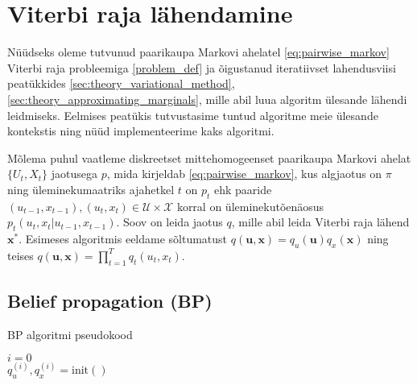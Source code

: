 \section{Viterbi raja lähendamine}

Nüüdseks oleme tutvunud paarikaupa Markovi ahelatel \eqref{eq:pairwise_markov} Viterbi raja probleemiga \eqref{problem_def} ja õigustanud iteratiivset lahendusviisi peatükkides \ref{sec:theory_variational_method}, \ref{sec:theory_approximating_marginals}, mille abil luua algoritm ülesande lähendi leidmiseks. Eelmises peatükis tutvustasime tuntud algoritme meie ülesande kontekstis ning nüüd implementeerime kaks algoritmi.

Mõlema puhul vaatleme diskreetset mittehomogeenset paarikaupa Markovi ahelat $\{U_t,X_t\}$ jaotusega $p$, mida kirjeldab \ref{eq:pairwise_markov}, kus algjaotus on $\pi$ ning üleminekumaatriks ajahetkel $t$ on $p_t$ ehk paaride $(u_{t-1},x_{t-1}),(u_t,x_t) \in \mathcal{U} \times \mathcal{X}$ korral on üleminekutõenäosus $p_t(u_t,x_t|u_{t-1},x_{t-1})$. Soov on leida jaotus $q$, mille abil leida Viterbi raja lähend $\bm{x}^*$. Esimeses algoritmis eeldame sõltumatust $q(\bm{u},\bm{x}) = q_u(\bm{u})q_x(\bm{x})$ ning teises $q(\bm{u},\bm{x}) = \prod_{t=1}^T q_t(u_t,x_t)$.


\subsection{Belief propagation (BP)}\label{sec:BP}

\begin{algorithm}[ht]
\DontPrintSemicolon
\caption{BP algoritmi pseudokood}\label{alg:bp}
$i  = 0$\\
$q_u^{(i)},q_x^{(i)}  = \text{init}()$\;
\end{algorithm}

